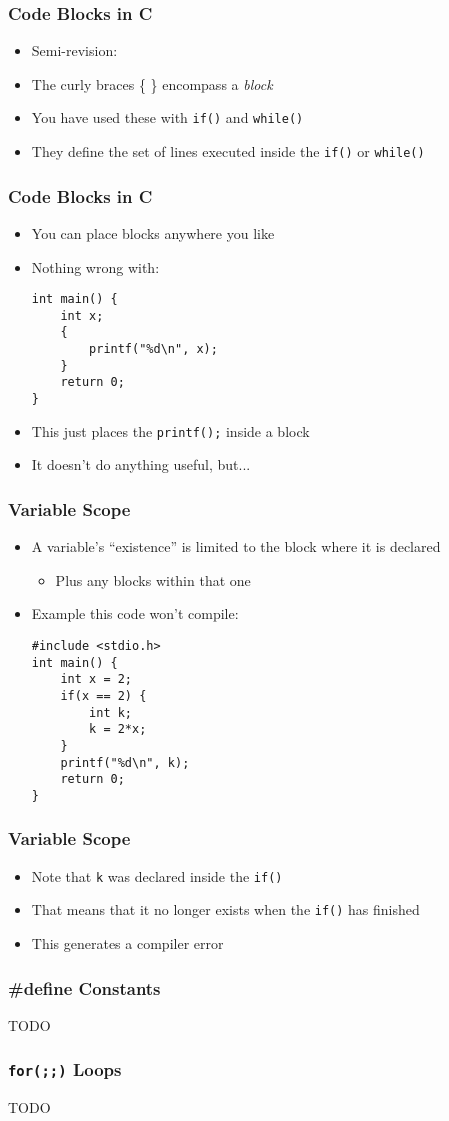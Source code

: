 \documentclass[14pt]{beamer}
\begin{document}
\begin{frame}[fragile]
\frametitle{Code Blocks in C}
\begin{itemize}
\item Semi-revision:
\item The curly braces \{ \} encompass a \textit{block}
\item You have used these with \texttt{if()} and \texttt{while()}
\item They define the set of lines executed inside the \texttt{if()} or \texttt{while()}

\end{itemize}
\end{frame}

\begin{frame}[fragile]
\frametitle{Code Blocks in C}
\begin{itemize}
\item You can place blocks anywhere you like
\item Nothing wrong with:
\begin{lstlisting}[style=CStyle]
int main() {
	int x;
	{
		printf("%d\n", x);
	}
	return 0;
}
\end{lstlisting}
\item This just places the \texttt{printf();} inside a block
\item It doesn't do anything useful, but...
\end{itemize}
\end{frame}

\begin{frame}[fragile]
\frametitle{Variable Scope}
\begin{itemize}
\item A variable's ``existence'' is limited to the block where it is declared
	\begin{itemize}
		\item Plus any blocks within that one
	\end{itemize}
\item Example this code won't compile:
\begin{lstlisting}[style=CStyle]
#include <stdio.h>
int main() {
	int x = 2;
	if(x == 2) {
		int k;
		k = 2*x;
	}
	printf("%d\n", k);
	return 0;
}
\end{lstlisting}
\end{itemize}
\end{frame}

\begin{frame}
\frametitle{Variable Scope}
\begin{itemize}
\item Note that \texttt{k} was declared inside the \texttt{if()}
\item That means that it no longer exists when the \texttt{if()} has finished
\item This generates a compiler error
\end{itemize}
\end{frame}

\begin{frame}
\frametitle{\#define Constants}
TODO
\end{frame}

\begin{frame}
\frametitle{\texttt{for(;;)} Loops}
TODO
\end{frame}
\end{document}
